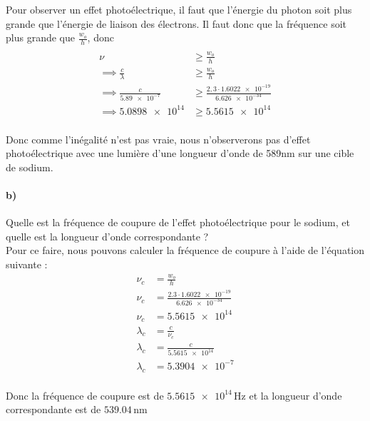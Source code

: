\documentclass[11pt, letterpaper]{article}
\begin{document}
Pour observer un effet photoélectrique, il faut que l'énergie du photon soit
plus grande que l'énergie de liaison des électrons. Il faut donc que la
fréquence soit plus grande que $\frac{w_o}{h}$, donc
\begin{align*}
    \\ \nu & \ge \frac{w_o}{h}
    \\\implies 
    \frac{c}{\lambda} & \ge \frac{w_o}{h}
    \\\implies 
    \frac{c}{\num{5.89e-7}} & \ge \frac{2,3 \cdot \num{1.6022e-19}}{\num{6.626e-34}}
    \\\implies \num{5.0898e14}&\ge \num{5.5615e14}\\
\end{align*}

\begin{tcolorbox}
    Donc comme l'inégalité n'est pas vraie, nous n'observerons pas d'effet photoélectrique avec une lumière d'une longueur d'onde de 589nm sur une cible de sodium.
\end{tcolorbox}
\vspace{0.2cm}



\paragraph*{b)}
Quelle est la fréquence de coupure de l’effet photoélectrique pour le sodium, et quelle est
la longueur d’onde correspondante ? \\

Pour ce faire, nous pouvons calculer la fréquence de coupure à l'aide de
l'équation suivante :\\
\begin{align*}
    \nu_c & = \frac{w_o}{h}
    \\   \nu_c & =\frac{2.3 \cdot \num{1.6022e-19}}{\num{6.626e-34}}
    \\  \nu_c & = \num{5.5615e14}
    \\ \lambda_c & = \frac{c}{\nu_c}
    \\ \lambda_c & = \frac{c}{\num{5.5615e14}} 
    \\ \lambda_c &= \num{5.3904e-7} \\
\end{align*}

\begin{tcolorbox}[tommy]
    Donc la fréquence de coupure est de $\num{5.5615e14}\,$Hz et la longueur d'onde correspondante est de $539.04\,$nm 
\end{tcolorbox}
\end{document}

